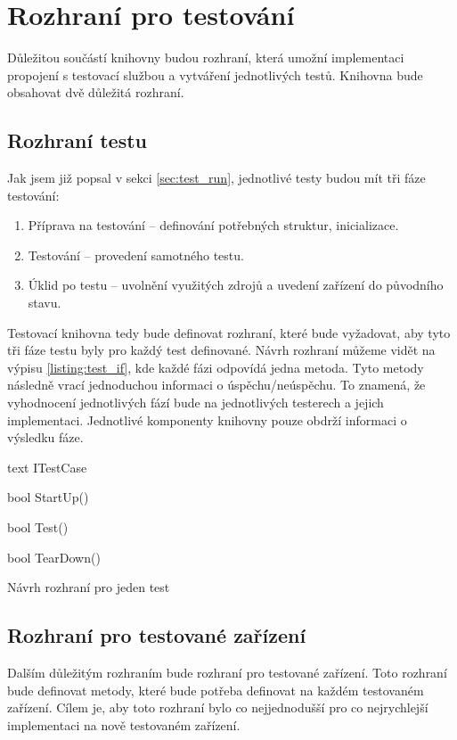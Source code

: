 \section{Rozhraní pro testování}
Důležitou součástí knihovny budou rozhraní, která umožní implementaci propojení s testovací službou a vytváření jednotlivých testů. Knihovna bude obsahovat dvě důležitá rozhraní. 

\subsection{Rozhraní testu}
Jak jsem již popsal v sekci \ref{sec:test_run}, jednotlivé testy budou mít tři fáze testování:

\begin{enumerate}
    \item Příprava na testování -- definování potřebných struktur, inicializace.
    \item Testování -- provedení samotného testu.
    \item Úklid po testu -- uvolnění využitých zdrojů a uvedení zařízení do původního stavu.
\end{enumerate}

Testovací knihovna tedy bude definovat rozhraní, které bude vyžadovat, aby tyto tři fáze testu byly pro každý test definované. Návrh rozhraní můžeme vidět na výpisu \ref{listing:test_if}, kde každé fázi odpovídá jedna metoda. Tyto metody následně vrací jednoduchou informaci o úspěchu/neúspěchu. To znamená, že vyhodnocení jednotlivých fází bude na jednotlivých testerech a jejich implementaci. Jednotlivé komponenty knihovny pouze obdrží informaci o výsledku fáze.

\begin{listing}[htbp]
    \centering
    \begin{cminted}[breaklines]{text}
ITestCase 
{
    bool StartUp()

    bool Test()

    bool TearDown()
}
    \end{cminted}
\caption{Návrh rozhraní pro jeden test}
\label{listing:test_if}
\end{listing}


\subsection{Rozhraní pro testované zařízení}\label{sec:deviceif}

Dalším důležitým rozhraním bude rozhraní pro testované zařízení. Toto rozhraní bude definovat metody, které bude potřeba definovat na každém testovaném zařízení. Cílem je, aby toto rozhraní bylo co nejjednodušší pro co nejrychlejší implementaci na nově testovaném zařízení.

